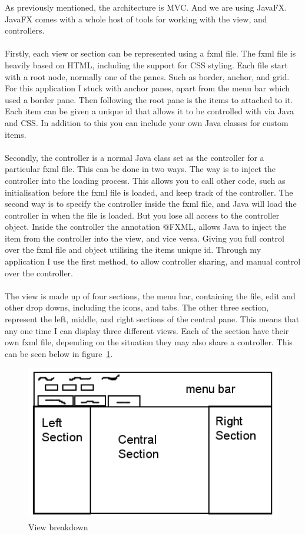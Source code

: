 As previously mentioned, the architecture is MVC. And we are using JavaFX. JavaFX comes with a whole host of tools for working with the view, and controllers. 
\\\\
Firstly, each view or section can be represented using a fxml file. The fxml file is heavily based on HTML, including the support for CSS styling. Each file start with a root node, normally one of the panes. Such as border, anchor, and grid. For this application I stuck with anchor panes, apart from the menu bar which used a border pane. Then following the root pane is the items to attached to it. Each item can be given a unique id that allows it to be controlled with via Java and CSS. In addition to this you can include your own Java classes for custom items.
\\\\
Secondly, the controller is a normal Java class set as the controller for a particular fxml file. This can be done in two ways. The way is to inject the controller into the loading process. This allows you to call other code, such as initialisation before the fxml file is loaded, and keep track of the controller. The second way is to specify the controller inside the fxml file, and Java will load the controller in when the file is loaded. But you lose all access to the controller object. Inside the controller the annotation @FXML, allows Java to inject the item from the controller into the view, and vice versa. Giving you full control over the fxml file and object utilising the items unique id. Through my application I use the first method, to allow controller sharing, and manual control over the controller. 
\\\\
The view is made up of four sections, the menu bar, containing the file, edit and other drop downs, including the icons, and tabs. The other three section, represent the left, middle, and right sections of the central pane. This means that any one time I can display three different views. Each of the section have their own fxml file, depending on the situation they may also share a controller. This can be seen below in figure~\ref{fig:view_breakdown}.

\begin{figure}[H]
	\centering
	\includegraphics[scale=0.5]{images/view_breakdown.png}
	\caption{View breakdown}
	\label{fig:view_breakdown}
\end{figure}

